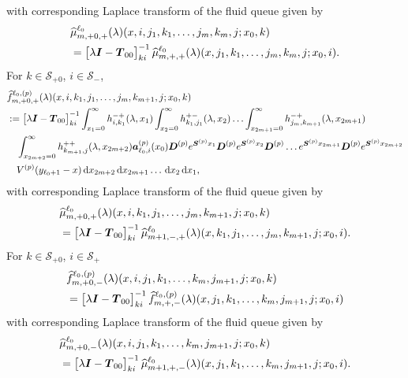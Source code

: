 with corresponding Laplace transform of the fluid queue given by 
\begin{align}
	&\widehat \mu_{m,+0,+}^{\ell_0}(\lambda)(x,i,j_1,k_1,\dots,j_m,k_m,j;x_0,k) \nonumber 
	\\&= \begin{bmatrix} \lambda \boldsymbol I - \boldsymbol T_{00} \end{bmatrix}^{-1}_{ki}\widehat \mu_{m,+,+}^{\ell_0}(\lambda)(x,j_1,k_1,\dots,j_m,k_m,j;x_0,i).
\end{align}
For \(k\in\mathcal S_{+0}\), \(i\in\mathcal S_-\),
\begin{align}
	&\widehat{f}_{m,+0,+}^{\ell_0,(p)}(\lambda)(x,i,k_1,j_1,\dots,j_m,k_{m+1},j;x_0,k)\nonumber 
	\\&:=\begin{bmatrix} \lambda \boldsymbol I - \boldsymbol T_{00} \end{bmatrix}^{-1}_{ki}\int_{x_1=0}^\infty h^{-+}_{i,k_{1}}(\lambda,x_1)\nonumber
	\int_{x_2=0}^\infty h^{+-}_{k_1,j_1}(\lambda,x_2)
	\hdots \int_{x_{2m+1}=0}^\infty h^{-+}_{j_{m},k_{m+1}}(\lambda, x_{2m+1}) 
	\\&\quad \int_{x_{2m+2}=0}^\infty h^{++}_{k_{m+1},j}(\lambda,x_{2m+2})
	 \boldsymbol   a_{\ell_0,i}^{(p)}(x_0)\boldsymbol D^{(p)}e^{\boldsymbol{S}^{(p)}x_1} \boldsymbol{D}^{(p)} e^{\boldsymbol{S}^{(p)}x_2} \boldsymbol{D}^{(p)}\dots e^{\boldsymbol{S}^{(p)}x_{2m+1}}  \boldsymbol{D}^{(p)}e^{\boldsymbol{S}^{(p)}x_{2m+2}} \nonumber 
	 \\&\quad{} V^{(p)}(y_{\ell_0+1}-x)  \, \mathrm{d} x_{2m+2} \, \mathrm{d} x_{2m+1}\dots\, \mathrm{d} x_2 \, \mathrm{d} x_1,\label{eqn: k0jJ0AAAaAA}
\end{align}
with corresponding Laplace transform of the fluid queue given by 
\begin{align}
	&\widehat \mu_{m,+0,+}^{\ell_0}(\lambda)(x,i,k_1,j_1,\dots,j_m,k_{m+1},j;x_0,k) \nonumber 
	\\&= \begin{bmatrix} \lambda \boldsymbol I - \boldsymbol T_{00} \end{bmatrix}^{-1}_{ki}\widehat \mu_{m+1,-,+}^{\ell_0}(\lambda)(x,k_1,j_1,\dots,j_m,k_{m+1},j;x_0,i).
\end{align}
For \(k\in\mathcal S_{+0}\), \(i\in\mathcal S_+\)
\begin{align}
		&\widehat{f}_{m,+0,-}^{\ell_0,(p)}(\lambda)(x,i,j_1,k_1,\dots,k_m,j_{m+1},j;x_0,k) \nonumber 
		\\&=\begin{bmatrix} \lambda \boldsymbol I - \boldsymbol T_{00} \end{bmatrix}^{-1}_{ki}\widehat{f}_{m,+,-}^{\ell_0,(p)}(\lambda)(x,j_1,k_1,\dots,k_m,j_{m+1},j;x_0,i)
		\label{eqn: k0jJ0asfcavv134}
\end{align} 
with corresponding Laplace transform of the fluid queue given by 
\begin{align}
		&\widehat{\mu}_{m,+0,-}^{\ell_0}(\lambda)(x,i,j_1,k_1,\dots,k_m,j_{m+1},j;x_0,k) \nonumber 
		\\&=\begin{bmatrix} \lambda \boldsymbol I - \boldsymbol T_{00} \end{bmatrix}^{-1}_{ki}\widehat{\mu}_{m+1,+,-}^{\ell_0}(\lambda)(x,j_1,k_1,\dots,k_m,j_{m+1},j;x_0,i).
		\label{eqn: k0jJ0asfcavv134asdga}
\end{align} 
